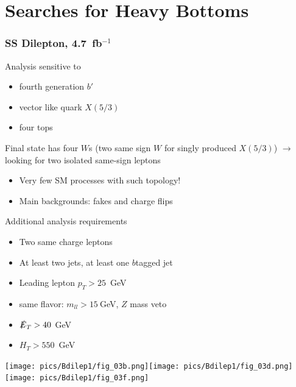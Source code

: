 \documentclass[xcolor=dvipsnames,10pt]{beamer}
\newcommand{\ifb}{~fb$^{-1}$}
\begin{document}
\section{Searches for Heavy Bottoms}
\begin{frame}\frametitle{SS Dilepton, 4.7\ifb~\cite{ATLAS-CONF-2012-130}} %
\footnotesize\centering

\begin{minipage}{.5\textwidth}
\centering


Analysis sensitive to 
\scriptsize
\begin{itemize}
\item fourth generation $b'$
\item vector like quark $X(5/3)$
\item four tops
\end{itemize}

Final state has \alert{four $W$s} (two same sign $W$ for singly produced $X(5/3)$) $\rightarrow$ looking for two isolated \alert{same-sign leptons}
\begin{itemize}
\item Very few SM processes with such topology!
\item Main backgrounds: fakes and charge flips
\end{itemize}



\end{minipage}\begin{minipage}{.5\textwidth}
\centering

Additional analysis requirements

\scriptsize
\begin{itemize}
\item Two same charge leptons
\item At least two jets, at least one $b$tagged jet
\item Leading lepton $p_T>25$~GeV
\item same flavor: $m_{ll}>15~$GeV, \alert{$Z$ mass veto}
\item $\slashed{E}_T>40~$GeV
\item $H_T>550$~GeV
\end{itemize}

\end{minipage}

\vspace{\baselineskip}

\texttt{[image: pics/Bdilep1/fig\_03b.png]}\texttt{[image: pics/Bdilep1/fig\_03d.png]}\texttt{[image: pics/Bdilep1/fig\_03f.png]}


\end{frame}
\end{document}
